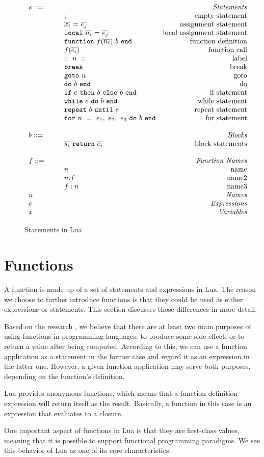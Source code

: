 \begin{figure}
\caption{Statements in Lua}
\label{fig:LuaStat}
\[
\begin{array}{llr}
  \mydefhead{s ::=\qquad\qquad\qquad\qquad}{Statements}
  \mydefcase{;}{empty statement}
  \mydefcase{\assign x e}{assignment statement}
  \mydefcase{\local n e}{local assignment statement}
  \mydefcase{\function f n b}{function definition}
  \mydefcase{f(\overline{e_i})}{function call}
  \mydefcase{::~n~::}{label}
  \mydefcase{\tt break}{break}
  \mydefcase{{\tt goto} ~n}{goto}
  \mydefcase{\doe b}{do}
  \mydefcase{\ife e b b}{if statement}
  \mydefcase{\whilee e b}{while statement}
  \mydefcase{\repeate e b}{repeat statement}
  \mydefcase{\for n e b}{for statement}
  \\
  \mydefhead{b ::=\qquad\qquad\qquad\qquad}{Blocks}
  \mydefcase{\overline{s_i}~{\tt return}~\overline{e_i}}{block statements}
  \\
  \mydefhead{f ::=\qquad\qquad\qquad\qquad}{Function Names}
  \mydefcase{n}{name}
  \mydefcase{n.f}{name2}
  \mydefcase{f:n}{name3}
  \mydefhead{n \qquad\qquad\qquad\qquad}{Names}
  \mydefhead{e \qquad\qquad\qquad\qquad}{Expressions}
  \mydefhead{x \qquad\qquad\qquad\qquad}{Variables}
\end{array}
\]
\end{figure}

\section{Functions}
A function is made up of a set of statements and expressions in Lua. The reason we choose to further introduce functions is that they could be used as either expressions or statements.
This section discusses those differences in more detail.

Based on the research \cite{PIL}, we believe that there are at least two main purposes of using functions in programming languages: to produce some side effect, or to return a value after being computed. According to this, we can use a function application as a statement in the former case and regard it as an expression in the latter one. However, a given function application may serve both purposes, depending on the function's definition.

Lua provides anonymous functions, which means that a function definition expression will return itself as the result. Basically, a function in this case is an expression that evaluates to a closure.

One important aspect of functions in Lua is that they are first-class values,
meaning that it is possible to support functional programming paradigms.
We see this behavior of Lua as one of its core characteristics.

